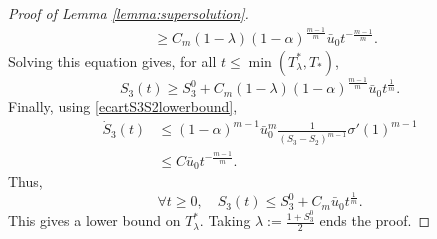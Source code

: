 \documentclass[10pt,a4paper]{amsart}
\newcommand{\al}{\alpha}
\newcommand{\la}{\lambda}
\begin{document}
\begin{proof}[Proof of Lemma \ref{lemma:supersolution}]
\begin{align*}
    &\ge C_m (1-\la )(1-\al)^\frac{m-1}{m}\bar u_0 t^{-\frac{m-1}{m}}.
\end{align*}
Solving this equation gives, for all $t\le \min(T_\la^*, T_*)$,
\begin{equation*}
    S_3(t) \ge S_3^0 + C_m (1-\la )(1-\al)^\frac{m-1}{m}\bar u_0t^\frac{1}{m}.
\end{equation*}
Finally, using \eqref{ecartS3S2lowerbound},
\begin{align*}
    \dot S_3(t)& \le (1-\al)^{m-1}\bar u_0^m \frac{1 }{(S_3-S_2)^{m-1}}\sigma'(1)^{m-1} \\
    &\le C \bar u_0 t^{-\frac{m-1}{m}}.
\end{align*}
Thus, 
\begin{equation*}
   \forall t\ge 0,\quad  S_3(t) \le S_3^0 + C_m \bar u_0 t^\frac{1}{m}.
\end{equation*}
This gives a lower bound on $T_\la^*$. Taking $\displaystyle \la := \frac{1+S_3^0}{2}$ ends the proof.
\end{proof}
\end{document}
